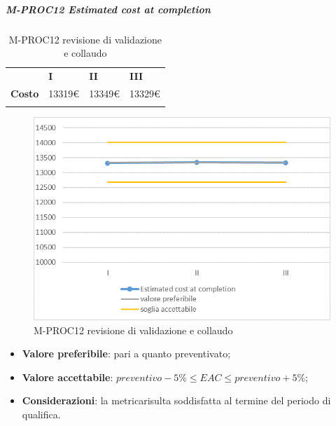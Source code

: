 \subparagraph{M-PROC12 Estimated cost at completion} \mbox{}
\begin{longtable}[H!] {						
		>{}p{35mm}  		
		>{}p{12mm}
		>{}p{12mm}		
		>{}p{12mm}		
	}
	\rowcolor{gray!50}
	\textbf{} & \textbf{I} & \textbf{II} & \textbf{III}  \TBstrut \\ [2mm]
	\textbf{Costo} & 13319\euro & 13349\euro & 13329\euro \TBstrut \\ [2mm]
	\rowcolor{white}
	\caption{M-PROC12 revisione di validazione e collaudo}
\end{longtable}
\begin{figure}[H] 	
	\includegraphics[width=\linewidth]{./img/grafici/RA12.png}	
	\caption{M-PROC12 revisione di validazione e collaudo}	
\end{figure}
\begin{itemize}
	\item \textbf{Valore preferibile}: pari a quanto preventivato;
	\item \textbf{Valore accettabile}: $preventivo-5\% \le EAC \le preventivo+5\%$;
	\item \textbf{Considerazioni}: la metrica\glosp risulta soddisfatta al termine del periodo di qualifica.
\end{itemize}


